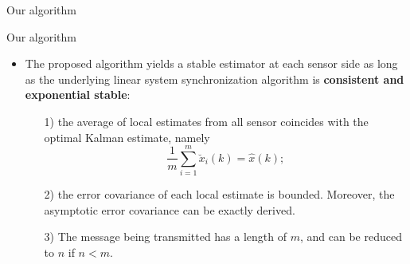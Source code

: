 \documentclass[10pt]{beamer}
\DeclareMathOperator{\1}{\textbf{1}}
\begin{document}
\begin{frame}{Our algorithm}
  \begin{figure}
    \centering
    \resizebox{0.63\textwidth}{!}{}
  \end{figure}
\end{frame}

\begin{frame}{Our algorithm}
  \begin{itemize}
    \item The proposed algorithm yields a \textcolor{thupurple}{stable estimator} at each sensor side as long as the underlying linear system synchronization algorithm is {\bf consistent and exponential stable}:
      \begin{enumerate}
	\item[1)] the average of local estimates from all sensor coincides with the optimal Kalman estimate, namely
	  \begin{equation}
	    \frac{1}{m}\sum_{i=1}^m \breve{x}_i(k)=\hat{x}(k);
	  \end{equation}
	\item[2)] the error covariance of each local estimate is bounded. Moreover, the asymptotic error covariance can be exactly derived.
	\item[3)]  The message being transmitted has a length of $m$, and can be reduced to $n$ if $n<m$.
      \end{enumerate} 
  \end{itemize}
\end{frame}
\end{document}
